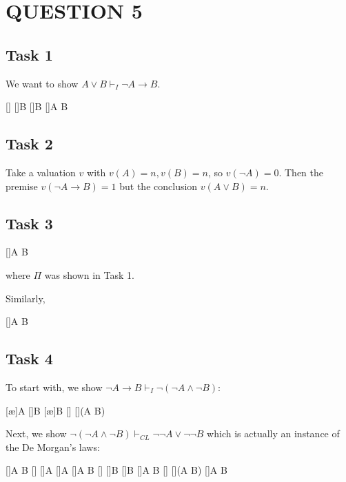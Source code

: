 \section*{QUESTION 5}

\subsection*{Task 1}
We want to show $A \lor B \vdash_I \neg A \to B$.
\begin{prooftree*}
[\nege]{\bot}
[\bote]{B}
[]{B}
[]{\neg A \to B}
\end{prooftree*}

\subsection*{Task 2}
Take a valuation $v$ with $v(A) = n, v(B) = n$, so $v(\neg A) = 0$. Then the premise $v(\neg A \to B) = 1$ but the conclusion $v(A \lor B) = n$.

\subsection*{Task 3}
\begin{prooftree*}
[\di]{A \lor B}
\end{prooftree*}
where $\Pi$ was shown in Task 1.

Similarly,
\begin{prooftree*}
[\di]{A \lor B}
\end{prooftree*}

\subsection*{Task 4}
To start with, we show $\neg A \to B \vdash_I \neg (\neg A \land \neg B)$:
\begin{prooftree*}
[\ae]{\neg A}
[\ce]{B}
[\ae]{\neg B}
[\nege]{\bot}
[]{\neg (\neg A \land \neg B)}
\end{prooftree*}

Next, we show $\neg (\neg A \land \neg B) \vdash_{CL} \neg\neg A \lor \neg\neg B$ which is actually an instance of the De Morgan's laws:
\begin{prooftree*}
\fontsize{8}{9}\selectfont
{}
[\di]{\neg\neg A \lor \neg\neg B}
[\nege]{\bot}
[]{\neg\neg\neg A}
[\dne]{\neg A}
[\di]{\neg\neg A \lor \neg\neg B}
[\nege]{\bot}
[]{\neg\neg\neg B}
[\dne]{\neg B}
[\ai]{\neg A \land \neg B}
[\nege]{\bot}
[]{\neg\neg (\neg\neg A \lor \neg\neg B)}
[\dne]{\neg\neg A \lor \neg\neg B}
\end{prooftree*}

